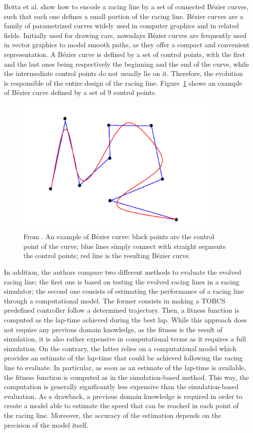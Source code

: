 Botta et al. \cite{botta} show how to encode a racing line by a set of connected B\'{e}zier curves, such that each one defines a small portion of the racing line. B\'{e}zier curves are a family of parametrized curves widely used in computer graphics and in related fields. Initially used for drawing cars, nowadays B\'{e}zier curves are frequently used in vector graphics to model smooth paths, as they offer a compact and convenient representation.
A B\'{e}zier curve is defined by a set of control points, with the first and the last ones being respectively the beginning and the end of the curve, while the intermediate control points do not usually lie on it. Therefore, the evolution is responsible of the entire design of the racing line. Figure~\ref{fig:bezier} shows an example of  B\'{e}zier curve defined by
a set of 9 control points.
  \begin{figure}
    \centering
 	  \captionsetup{width=10cm}
      \includegraphics[width=10cm]{./img/bezier}
     \caption{From \cite{botta}. An example of B\'{e}zier curve: black points are the control point of the curve; blue lines simply connect with straight segments the control points; red line is the resulting B\'{e}zier curve.}
   \label{fig:bezier}
  \end{figure}
In addition, the authors compare two different methods to evaluate the evolved racing line; the first one is based on testing the evolved racing lines in a racing simulator; the second one consists of estimating the performance of a racing line through a computational model.
The former consists in making a TORCS predefined controller follow a determined trajectory. Then, a fitness function is computed as the lap-time achieved during the best lap. While this approach does not require any previous domain knowledge, as the fitness is the result of simulation, it is also rather expensive in computational terms as it requires a full simulation. 
On the contrary, the latter relies on a computational model which provides an estimate of the lap-time
that could be achieved following the racing line to evaluate. In particular, as soon as an estimate of the lap-time is available, the fitness function is computed as in the simulation-based method. This way, the computation is generally significantly less expensive than the simulation-based evaluation. As a drawback, a previous domain knowledge is required in order to create a model able to estimate the speed that can be reached in each point of the racing line. Moreover, the accuracy of the estimation depends on the precision of the model itself.

